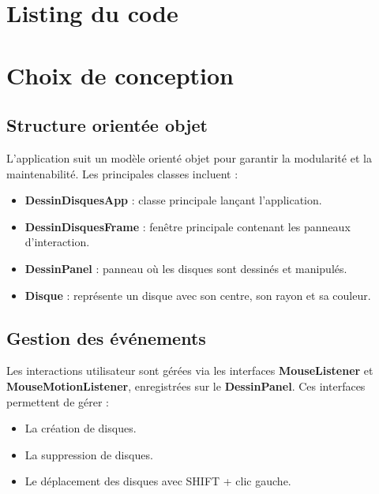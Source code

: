 \documentclass[12pt]{report}
\begin{document}
    \section*{Listing du code}
    

    \section*{Choix de conception}
    \subsection*{Structure orientée objet}
    L'application suit un modèle orienté objet pour garantir la modularité et la maintenabilité. Les principales classes incluent :
    \begin{itemize}
        \item \textbf{DessinDisquesApp} : classe principale lançant l'application.
        \item \textbf{DessinDisquesFrame} : fenêtre principale contenant les panneaux d'interaction.
        \item \textbf{DessinPanel} : panneau où les disques sont dessinés et manipulés.
        \item \textbf{Disque} : représente un disque avec son centre, son rayon et sa couleur.
    \end{itemize}

    \subsection*{Gestion des événements}
    Les interactions utilisateur sont gérées via les interfaces \textbf{MouseListener} et \textbf{MouseMotionListener}, enregistrées sur le \textbf{DessinPanel}. Ces interfaces permettent de gérer :
    \begin{itemize}
        \item La création de disques.
        \item La suppression de disques.
        \item Le déplacement des disques avec SHIFT + clic gauche.
    \end{itemize}
\end{document}
